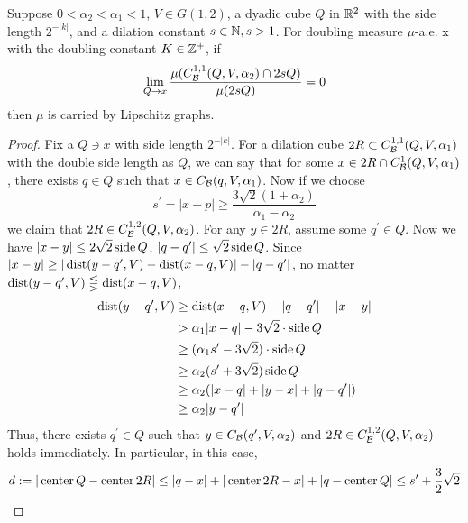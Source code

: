 \begin{lemma}
    Suppose $0<\alpha_2<\alpha_1<1$, $V\in G(1,2)$, a dyadic cube $Q$ in $\mathbb{R}^2$ with the side length $2^{-|k|}$, and a dilation constant $s\in\mathbb{N},s>1$. For doubling measure $\mu$-a.e. x with the doubling constant $K\in \mathbb{Z}^+$, if
    \begin{equation}
        \lim_{Q\rightarrow x}\frac{\mu(C_\mathcal B^{1,1}(Q, V, \alpha_2)\cap 2sQ)}{\mu(2sQ)} = 0
    \end{equation}
    then $\mu$ is carried by Lipschitz graphs. 
\end{lemma}
\begin{proof}
    Fix a $Q\ni x$ with side length $2^{-|k|}$. For a dilation cube $2R\subset C_\mathcal B^{1,1}(Q, V, \alpha_1)$ with the double side length as $Q$, we can say that for some $x\in 2R \cap C_\mathcal B^{1}(Q, V, \alpha_1)$, there exists $q\in Q$ such that $x\in C_\mathcal B(q, V, \alpha_1)$. Now if we choose
    \begin{equation}\label{eq:lb4d}
        s^\prime=|x-p| \geq \frac{3\sqrt{2}(1+\alpha_2)}{\alpha_1-\alpha_2}
    \end{equation}
    we claim that $2R\in  C_\mathcal B^{1,2}(Q, V, \alpha_2)$. For any $y\in 2R$, assume some $q^\prime\in Q$. Now we have $|x-y|\leq 2\sqrt{2}\operatorname{side} Q$, $|q-q^\prime|\leq \sqrt{2}\operatorname{side} Q$. Since $ |x-y| \geq|\operatorname{dist} (y-q^\prime, V)-\operatorname{dist}(x-q, V)| - |q-q^\prime|$, no matter $\operatorname{dist} (y-q^\prime, V)\lesseqgtr\operatorname{dist}(x-q, V)$,
    \begin{equation*}
        \begin{split}
            \operatorname{dist}(y-q^\prime, V) &\geq \operatorname{dist}(x-q, V)-|q-q^\prime|-|x-y| \\
            &> \alpha_1|x-q| - 3\sqrt{2}\cdot \operatorname{side} Q\\
            &\geq (\alpha_1 s^\prime- 3\sqrt{2})\cdot\operatorname{side} Q\\
            &\geq \alpha_2(s^\prime+3\sqrt{2})\operatorname{side} Q \\
            &\geq \alpha_2(|x-q|+|y-x|+|q-q^\prime|)\\
            &\geq \alpha_2|y-q^\prime|
        \end{split}
    \end{equation*}
    Thus, there exists $q^\prime\in Q$ such that $y\in C_\mathcal B(q^\prime, V, \alpha_2)$ and $2R\in  C_\mathcal B^{1,2}(Q, V, \alpha_2)$ holds immediately. In particular, in this case, 
    \begin{equation}
        d := |\operatorname{center} Q -\operatorname{center} 2R| \leq |q-x|+|\operatorname{center} 2R-x|+|q-\operatorname{center} Q|\leq s^\prime+\frac{3}{2}\sqrt{2}
    \end{equation}


\end{proof}
